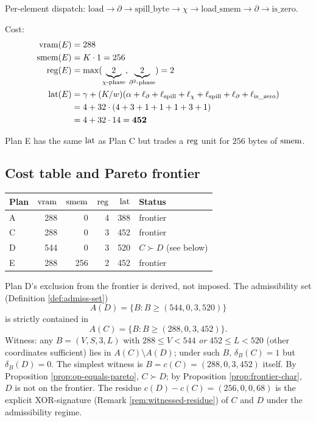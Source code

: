 Per-element dispatch:
$\mathrm{load} \to \partial \to \mathrm{spill\_byte}
\to \chi \to \mathrm{load\_smem} \to \partial \to
\mathrm{is\_zero}$.

Cost:
\begin{align*}
  \operatorname{vram}(E) &= 288 \\
  \operatorname{smem}(E) &= K \cdot 1 = 256 \\
  \operatorname{reg}(E)  &= \max(\underbrace{2}_{\chi\text{-phase}},
                   \underbrace{2}_{\partial^2\text{-phase}}) = 2 \\
  \operatorname{lat}(E)  &= \gamma + (K/w)(\alpha + \ell_\partial +
              \ell_{\text{spill}} + \ell_\chi +
              \ell_{\text{spill}} + \ell_\partial + \ell_{\text{is\_zero}}) \\
           &= 4 + 32 \cdot (4 + 3 + 1 + 1 + 1 + 3 + 1) \\
           &= 4 + 32 \cdot 14 = \mathbf{452}
\end{align*}

Plan E has the same $\operatorname{lat}$ as Plan C but trades a
$\operatorname{reg}$ unit for $256$ bytes of $\operatorname{smem}$.

\subsection{Cost table and Pareto frontier}
\label{app-e:pareto}

\begin{center}
\begin{tabular}{l|rrrr|l}
Plan & $\operatorname{vram}$ & $\operatorname{smem}$ & $\operatorname{reg}$ & $\operatorname{lat}$ & Status \\
\hline
A & 288 & 0   & 4 & 388 & frontier \\
C & 288 & 0   & 3 & 452 & frontier \\
D & 544 & 0   & 3 & 520 & $C \succ D$ (see below) \\
E & 288 & 256 & 2 & 452 & frontier \\
\end{tabular}
\end{center}

Plan D's exclusion from the frontier is derived, not
imposed. The admissibility set (Definition
\ref{def:admiss-set})
\begin{equation*}
  A(D) = \{B : B \geq (544, 0, 3, 520)\}
\end{equation*}
is strictly contained in
\begin{equation*}
  A(C) = \{B : B \geq (288, 0, 3, 452)\}.
\end{equation*}
Witness: any $B = (V, S, 3, L)$ with $288 \leq V <
544$ \emph{or} $452 \leq L < 520$ (other coordinates
sufficient) lies in $A(C) \setminus A(D)$; under
such $B$, $\delta_B(C) = 1$ but $\delta_B(D) = 0$.
The simplest witness is $B = c(C) = (288, 0, 3, 452)$
itself. By
Proposition \ref{prop:op-equals-pareto}, $C \succ
D$; by Proposition \ref{prop:frontier-char}, $D$ is
not on the frontier. The residue $c(D) - c(C) =
(256, 0, 0, 68)$ is the explicit XOR-signature
(Remark \ref{rem:witnessed-residue}) of $C$ and $D$
under the admissibility regime.

